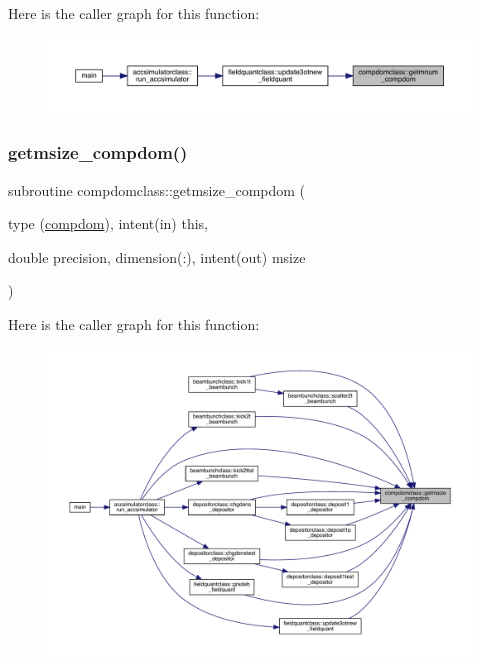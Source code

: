 Here is the caller graph for this function\+:\nopagebreak
\begin{figure}[H]
\begin{center}
\leavevmode
\includegraphics[width=350pt]{namespacecompdomclass_a4742fe5698151e1e31e2261798a433c8_icgraph}
\end{center}
\end{figure}
\mbox{\label{namespacecompdomclass_a460a22916802ee9041aa66d1922cb812}} 
\subsubsection{\texorpdfstring{getmsize\_compdom()}{getmsize\_compdom()}}
{\footnotesize\ttfamily subroutine compdomclass\+::getmsize\+\_\+compdom (\begin{DoxyParamCaption}\item[{type (\mbox{\hyperlink{namespacecompdomclass_structcompdomclass_1_1compdom}{compdom}}), intent(in)}]{this,  }\item[{double precision, dimension(\+:), intent(out)}]{msize }\end{DoxyParamCaption})}

Here is the caller graph for this function\+:\nopagebreak
\begin{figure}[H]
\begin{center}
\leavevmode
\includegraphics[width=350pt]{namespacecompdomclass_a460a22916802ee9041aa66d1922cb812_icgraph}
\end{center}
\end{figure}
\mbox{\label{namespacecompdomclass_acba710aa1017492e05a537273742cc16}} 
